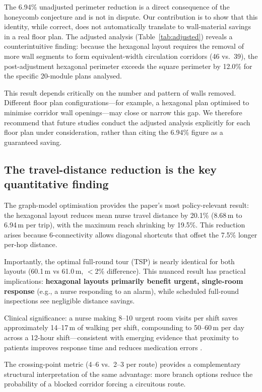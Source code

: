 \documentclass[12pt,a4paper]{article}
\begin{document}
The 6.94\% unadjusted perimeter reduction is a direct consequence of the
honeycomb conjecture and is not in dispute.
Our contribution is to show that this identity, while correct, does not automatically
translate to wall-material savings in a real floor plan.
The adjusted analysis (Table~\ref{tab:adjusted}) reveals a counterintuitive
finding: because the hexagonal layout requires the removal of more wall segments
to form equivalent-width circulation corridors (46 vs.\ 39), the post-adjustment
hexagonal perimeter exceeds the square perimeter by 12.0\% for the specific
20-module plans analysed.

This result depends critically on the number and pattern of walls removed.
Different floor plan configurations---for example, a hexagonal plan optimised to
minimise corridor wall openings---may close or narrow this gap.
We therefore recommend that future studies conduct the adjusted analysis explicitly
for each floor plan under consideration, rather than citing the 6.94\% figure as
a guaranteed saving.

\subsection{The travel-distance reduction is the key quantitative finding}

The graph-model optimisation provides the paper's most policy-relevant result:
the hexagonal layout reduces mean nurse travel distance by 20.1\%
(8.68\,m to 6.94\,m per trip), with the maximum reach shrinking by 19.5\%.
This reduction arises because 6-connectivity allows diagonal shortcuts that
offset the 7.5\% longer per-hop distance.

Importantly, the optimal full-round tour (TSP) is nearly identical for both
layouts (60.1\,m vs 61.0\,m, $<$2\% difference).
This nuanced result has practical implications: \textbf{hexagonal layouts primarily
benefit urgent, single-room response} (e.g., a nurse responding to an alarm),
while scheduled full-round inspections see negligible distance savings.

Clinical significance: a nurse making 8--10 urgent room visits per shift saves
approximately 14--17\,m of walking per shift, compounding to
50--60\,m per day across a 12-hour shift---consistent with emerging evidence that
proximity to patients improves response time and reduces medication errors
\cite{friesen2008nursing,ulrich2008evidence}.

The crossing-point metric (4--6 vs.\ 2--3 per route) provides a complementary
structural interpretation of the same advantage: more branch options reduce the
probability of a blocked corridor forcing a circuitous route.
\end{document}
